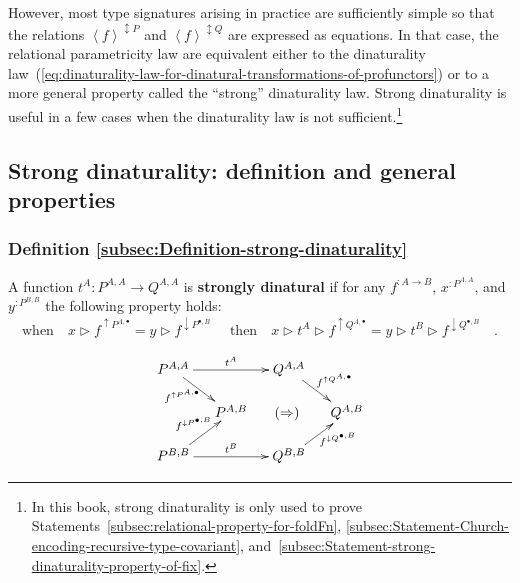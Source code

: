 However, most type signatures arising in practice are sufficiently
simple so that the relations $\left<f\right>^{\updownarrow P}$ and
$\left<f\right>^{\updownarrow Q}$ are expressed as equations. In
that case, the relational parametricity law are equivalent either
to the dinaturality law~(\ref{eq:dinaturality-law-for-dinatural-transformations-of-profunctors})
or to a more general property called the \textsf{``}strong\textsf{''} dinaturality
law. Strong dinaturality is useful in a few cases when the dinaturality
law is not sufficient.\footnote{In this book, strong dinaturality is only used to prove Statements~\ref{subsec:relational-property-for-foldFn},
\ref{subsec:Statement-Church-encoding-recursive-type-covariant},
and~\ref{subsec:Statement-strong-dinaturality-property-of-fix}.}

\subsection{Strong dinaturality: definition and general properties\label{subsec:Strong-dinaturality.-General-properties}}

\subsubsection{Definition \label{subsec:Definition-strong-dinaturality}\ref{subsec:Definition-strong-dinaturality}}

A function $t^{A}:P^{A,A}\rightarrow Q^{A,A}$ is \textbf{strongly
dinatural} if for any $f^{:A\rightarrow B}$,
$x^{:P^{A,A}}$, and $y^{:P^{B,B}}$ the following property holds:\vspace{-0.3\baselineskip}
\begin{equation}
\text{when}\quad x\triangleright f^{\uparrow P^{A,\bullet}}=y\triangleright f^{\downarrow P^{\bullet,B}}\quad\text{ then}\quad x\triangleright t^{A}\triangleright f^{\uparrow Q^{A,\bullet}}=y\triangleright t^{B}\triangleright f^{\downarrow Q^{\bullet,B}}\quad.\label{eq:strong-dinaturality-law}
\end{equation}

\begin{wrapfigure}{l}{0.32\columnwidth}%
\vspace{-2.5\baselineskip}
\[
\xymatrix{\xyScaleY{1.2pc}\xyScaleX{1.0pc}P^{A,A}\ar[rd]\sb(0.35){f^{\uparrow P^{A,\bullet}}\negthickspace\negthickspace}\ar[rr]\sp(0.5){t^{A}} &  & Q^{A,A}\ar[rd]\sp(0.5){f^{\uparrow Q^{A,\bullet}}}\\
 & P^{A,B} & \negthickspace(\Rightarrow) & Q^{A,B}\\
P^{B,B}\ar[ru]\sp(0.5){f^{\downarrow P^{\bullet,B}}\negthickspace\negthickspace\negthickspace}\ar[rr]\sp(0.5){t^{B}} &  & Q^{B,B}\ar[ru]\sb(0.65){\negthickspace\negthickspace f^{\downarrow Q^{\bullet,B}}}
}
\]
\vspace{-2\baselineskip}
\end{wrapfigure}%

